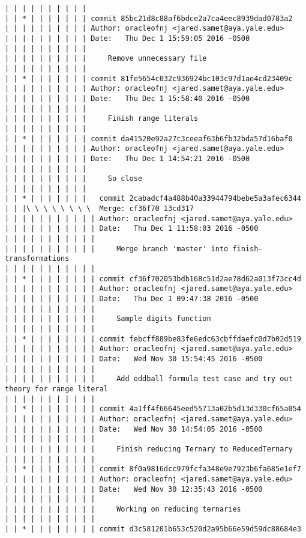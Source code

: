 \begin{lstlisting}
| | | | | | | | | |           
| | * | | | | | | | commit 85bc21d8c88af6bdce2a7ca4eec8939dad0783a2
| | | | | | | | | | Author: oracleofnj <jared.samet@aya.yale.edu>
| | | | | | | | | | Date:   Thu Dec 1 15:59:05 2016 -0500
| | | | | | | | | | 
| | | | | | | | | |     Remove unnecessary file
| | | | | | | | | |           
| | * | | | | | | | commit 81fe5654c032c936924bc103c97d1ae4cd23409c
| | | | | | | | | | Author: oracleofnj <jared.samet@aya.yale.edu>
| | | | | | | | | | Date:   Thu Dec 1 15:58:40 2016 -0500
| | | | | | | | | | 
| | | | | | | | | |     Finish range literals
| | | | | | | | | |           
| | * | | | | | | | commit da41520e92a27c3ceeaf63b6fb32bda57d16baf0
| | | | | | | | | | Author: oracleofnj <jared.samet@aya.yale.edu>
| | | | | | | | | | Date:   Thu Dec 1 14:54:21 2016 -0500
| | | | | | | | | | 
| | | | | | | | | |     So close
| | | | | | | | | |             
| | * | | | | | | |   commit 2cabadcf4a488b40a33944794bebe5a3afec6344
| | |\ \ \ \ \ \ \ \  Merge: cf36f70 13cd317
| | | | | | | | | | | Author: oracleofnj <jared.samet@aya.yale.edu>
| | | | | | | | | | | Date:   Thu Dec 1 11:58:03 2016 -0500
| | | | | | | | | | | 
| | | | | | | | | | |     Merge branch 'master' into finish-transformations
| | | | | | | | | | |            
| | * | | | | | | | | commit cf36f702053bdb168c51d2ae78d62a013f73cc4d
| | | | | | | | | | | Author: oracleofnj <jared.samet@aya.yale.edu>
| | | | | | | | | | | Date:   Thu Dec 1 09:47:38 2016 -0500
| | | | | | | | | | | 
| | | | | | | | | | |     Sample digits function
| | | | | | | | | | |            
| | * | | | | | | | | commit febcff889be83fe6edc63cbffdaefc0d7b02d519
| | | | | | | | | | | Author: oracleofnj <jared.samet@aya.yale.edu>
| | | | | | | | | | | Date:   Wed Nov 30 15:54:45 2016 -0500
| | | | | | | | | | | 
| | | | | | | | | | |     Add oddball formula test case and try out theory for range literal
| | | | | | | | | | |            
| | * | | | | | | | | commit 4a1ff4f66645eed55713a02b5d13d330cf65a054
| | | | | | | | | | | Author: oracleofnj <jared.samet@aya.yale.edu>
| | | | | | | | | | | Date:   Wed Nov 30 14:54:05 2016 -0500
| | | | | | | | | | | 
| | | | | | | | | | |     Finish reducing Ternary to ReducedTernary
| | | | | | | | | | |            
| | * | | | | | | | | commit 8f0a9816dcc979fcfa348e9e7923b6fa685e1ef7
| | | | | | | | | | | Author: oracleofnj <jared.samet@aya.yale.edu>
| | | | | | | | | | | Date:   Wed Nov 30 12:35:43 2016 -0500
| | | | | | | | | | | 
| | | | | | | | | | |     Working on reducing ternaries
| | | | | | | | | | |            
| | * | | | | | | | | commit d3c581201b653c520d2a95b66e59d59dc88684e3

\end{lstlisting}
